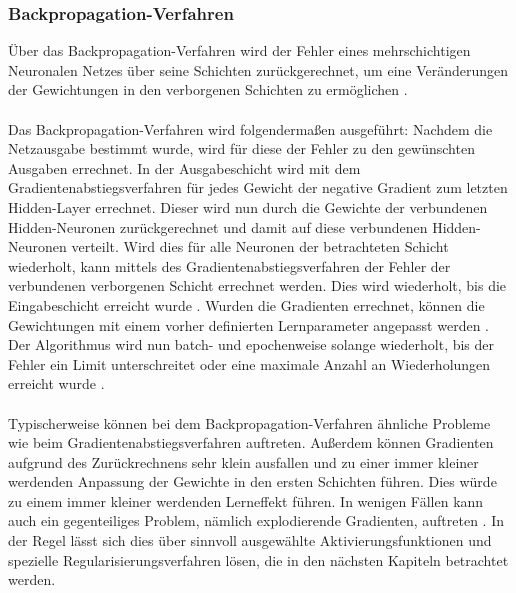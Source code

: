 \documentclass[11pt,bibliography=totocnumbered]{scrartcl}
\begin{document}
\subsubsection{Backpropagation-Verfahren}
Über das Backpropagation-Verfahren wird der Fehler eines mehrschichtigen Neuronalen Netzes über seine Schichten zurückgerechnet, um eine Veränderungen der Gewichtungen in den verborgenen Schichten zu ermöglichen \cite[S.51-52]{NN}.
\\\\
Das Backpropagation-Verfahren wird folgendermaßen ausgeführt: Nachdem die Netzausgabe bestimmt wurde, wird für diese der Fehler zu den gewünschten Ausgaben errechnet. In der Ausgabeschicht wird mit dem Gradientenabstiegsverfahren für jedes Gewicht der negative Gradient zum letzten Hidden-Layer errechnet. Dieser wird nun durch die Gewichte der verbundenen Hidden-Neuronen zurückgerechnet und damit auf diese verbundenen Hidden-Neuronen verteilt. Wird dies für alle Neuronen der betrachteten Schicht wiederholt, kann mittels des Gradientenabstiegsverfahren der Fehler der verbundenen verborgenen Schicht errechnet werden. Dies wird wiederholt, bis die Eingabeschicht erreicht wurde \cite[S.33]{BA}\cite[S.52-53]{NN}. Wurden die Gradienten errechnet, können die Gewichtungen mit einem vorher definierten Lernparameter angepasst werden \cite[S.262]{MACHINE_LEARNING}. Der Algorithmus wird nun batch- und epochenweise solange wiederholt, bis der Fehler ein Limit unterschreitet oder eine maximale Anzahl an Wiederholungen erreicht wurde \cite[S.52]{NN}.
\\\\
Typischerweise können bei dem Backpropagation-Verfahren ähnliche Probleme wie beim Gradientenabstiegsverfahren auftreten. Außerdem können Gradienten aufgrund des Zurückrechnens sehr klein ausfallen und zu einer immer kleiner werdenden Anpassung der Gewichte in den ersten Schichten führen. Dies würde zu einem immer kleiner werdenden Lerneffekt führen. In wenigen Fällen kann auch ein gegenteiliges Problem, nämlich explodierende Gradienten, auftreten \cite[S.33-34]{BA}\cite[S.275-276]{MACHINE_LEARNING}. In der Regel lässt sich dies über sinnvoll ausgewählte Aktivierungsfunktionen und spezielle Regularisierungsverfahren lösen, die in den nächsten Kapiteln betrachtet werden. 
\end{document}

